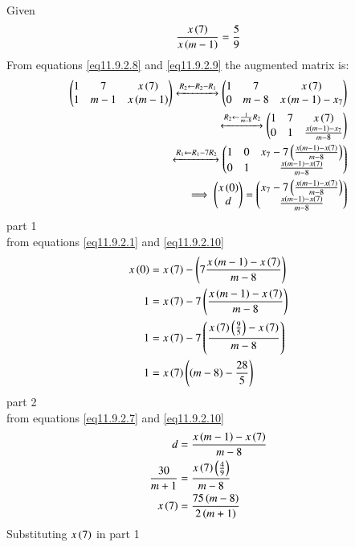 \documentclass[journal,12pt,twocolumn]{IEEEtran}
\theoremstyle{remark}
\begin{document}
Given 
\begin{align}
\frac{x\left(7\right)}{x\left(m-1\right)} = \frac{5}{9} \label{eq11.9.2.10}
\end{align}
From  equations \ref{eq11.9.2.8} and \ref{eq11.9.2.9} the augmented matrix is:\\
\begin{align}
 \begin{pmatrix}
   1 & 7 & x\left(7\right)
   \\
   1 & m-1 & x\left(m-1\right)
 \end{pmatrix}
 \xleftrightarrow[]{R_2 \leftarrow {R_2-R_1}}
 \begin{pmatrix}
   1 & 7 & x\left(7\right)
   \\
   0 & m-8 & x\left(m-1\right)-x_7
 \end{pmatrix}
 \\
 \xleftrightarrow[]{R_2 \leftarrow {\frac{1}{m-8}R_2}}
 \begin{pmatrix}
   1 & 7 & x\left(7\right)
   \\
   0 & 1 & \frac{x\left(m-1\right)-x_7}{m-8}
 \end{pmatrix}
 \\
 \xleftrightarrow[]{R_1 \leftarrow {R_1-7{R_2}}}
 \begin{pmatrix}
   1 & 0 & x_7-7\left(\frac{x\left(m-1\right)-x\left(7\right)}{m-8}\right)
   \\
   0 & 1 & \frac{x\left(m-1\right)-x\left(7\right)}{m-8}
 \end{pmatrix}
 \\
 \implies \begin{pmatrix}
   x\left(0\right)
   \\
   d
 \end{pmatrix}
 =
 \begin{pmatrix}
   x_7-7\left(\frac{x\left(m-1\right)-x\left(7\right)}{m-8}\right)
   \\
   \frac{x\left(m-1\right)-x\left(7\right)}{m-8}
 \end{pmatrix}
\end{align}
part 1\\
from equations \ref{eq11.9.2.1} and \ref{eq11.9.2.10}\\
\begin{align}
    x\left(0\right)&=x\left(7\right)-\left(7\frac{x\left(m-1\right)-x\left(7\right)}{m-8}\right)\\
    1&=x\left(7\right)-7\left(\frac{x\left(m-1\right)-x\left(7\right)}{m-8}\right)\\
    1&=x\left(7\right)-7\left(\frac{x\left(7\right)\left(\frac{9}{5}\right)-x\left(7\right)}{m-8}\right)\\
    1&=x\left(7\right)\left(\left(m-8\right)-\frac{28}{5}\right)
\end{align}
part 2\\
from equations \ref{eq11.9.2.7} and \ref{eq11.9.2.10}\\
 \begin{align}
    d&=\frac{x\left(m-1\right)-x\left(7\right)}{m-8}\\
    \frac{30}{m+1}&=\frac{x\left(7\right)\left(\frac{4}{9}\right)}{m-8}\\
    x\left(7\right)&=\frac{75\left(m-8\right)}{2\left(m+1\right)}\\
 \end{align}
Substituting $x\left(7\right)$ in part 1\\
\end{document}
